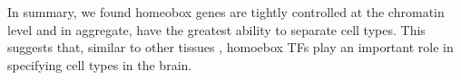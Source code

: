 In summary, we found homeobox genes are tightly controlled at the chromatin level and in aggregate, have the greatest ability to separate cell types. This suggests that, similar to other tissues \citep{Kratsios_2017,Zheng_2015,Dasen_2009,Philippidou_2013}, homoebox TFs play an important role in specifying cell types in the brain.





